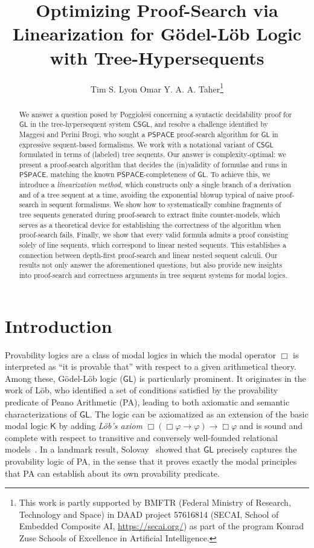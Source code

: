 \documentclass[copyright,creativecommons]{eptcs}
\title{Optimizing Proof-Search via Linearization for Gödel-Löb Logic with Tree-Hypersequents}
\author{Tim S. Lyon \qquad\qquad Omar Y. A. A. Taher\thanks{This work is partly supported by BMFTR (Federal Ministry of Research, Technology and Space) in DAAD project 57616814 (SECAI, School of Embedded Composite AI, \url{https://secai.org/}) as part of the program Konrad Zuse Schools of Excellence in Artificial Intelligence.}
\institute{TU Dresden \\ Nöthnitzer Straße 46, 01187 Dresden, Germany}
\email{\quad timothy\_stephen.lyon@tu-dresden.de \quad \quad omarkabdawiyehia@gmail.com}
}
\newcommand{\logicgl}{\mathsf{GL}}
\renewcommand{\phi}{\varphi}
\newcommand{\calc}{\mathsf{CSGL}}
\newcommand{\pspace}{\mathsf{PSPACE}}
\begin{document}
\maketitle

\begin{abstract}
We answer a question posed by Poggiolesi concerning a syntactic decidability proof for $\logicgl$ in the tree-hypersequent system $\calc$, and resolve a challenge identified by Maggesi and Perini Brogi, who sought a $\pspace$ proof-search algorithm for $\logicgl$ in expressive sequent-based formalisms. We work with a notational variant of $\calc$ formulated in terms of (labeled) tree sequents. Our answer is complexity-optimal: we present a proof-search algorithm that decides the (in)validity of formulae and runs in $\pspace$, matching the known $\pspace$-completeness of $\logicgl$. To achieve this, we introduce a \emph{linearization method}, which constructs only a single branch of a derivation and of a tree sequent at a time, avoiding the exponential blowup typical of naive proof-search in sequent formalisms. We show how to systematically combine fragments of tree sequents generated during proof-search to extract finite counter-models, which serves as a theoretical device for establishing the correctness of the algorithm when proof-search fails. Finally, we show that every valid formula admits a proof consisting solely of line sequents, which correspond to linear nested sequents. This establishes a connection between depth-first proof-search and linear nested sequent calculi. Our results not only answer the aforementioned questions, but also provide new insights into proof-search and correctness arguments in tree sequent systems for modal logics.
\end{abstract}

\section{Introduction}




Provability logics are a class of modal logics in which the modal operator $\Box$ is interpreted as “it is provable that” with respect to a given arithmetical theory. Among these, Gödel-Löb logic ($\logicgl$) is particularly prominent. It originates in the work of Löb, who identified a set of conditions satisfied by the provability predicate of Peano Arithmetic (PA), leading to both axiomatic and semantic characterizations of $\logicgl$. The logic can be axiomatized as an extension of the basic modal logic $\mathsf{K}$ by adding \emph{Löb’s axiom} $\Box(\Box \phi \rightarrow \phi) \rightarrow \Box \phi$ and is sound and complete with respect to transitive and conversely well-founded relational models~\cite{Seg71}. In a landmark result, Solovay~\cite{Sol76} showed that $\logicgl$ precisely captures the provability logic of PA, in the sense that it proves exactly the modal principles that PA can establish about its own provability predicate.
\end{document}
